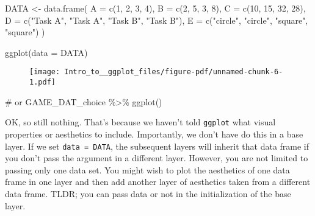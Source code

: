 \documentclass[
  letterpaper,
  DIV=11,
  numbers=noendperiod]{scrartcl}
\newenvironment{Shaded}{\begin{snugshade}}{\end{snugshade}}
\newcommand{\AttributeTok}[1]{\textcolor[rgb]{0.40,0.45,0.13}{#1}}
\newcommand{\CommentTok}[1]{\textcolor[rgb]{0.37,0.37,0.37}{#1}}
\newcommand{\DecValTok}[1]{\textcolor[rgb]{0.68,0.00,0.00}{#1}}
\newcommand{\FunctionTok}[1]{\textcolor[rgb]{0.28,0.35,0.67}{#1}}
\newcommand{\NormalTok}[1]{\textcolor[rgb]{0.00,0.23,0.31}{#1}}
\newcommand{\OtherTok}[1]{\textcolor[rgb]{0.00,0.23,0.31}{#1}}
\newcommand{\StringTok}[1]{\textcolor[rgb]{0.13,0.47,0.30}{#1}}
\begin{document}
\begin{Shaded}
\begin{Highlighting}[]
\NormalTok{DATA }\OtherTok{\textless{}{-}} \FunctionTok{data.frame}\NormalTok{(}
  \AttributeTok{A =} \FunctionTok{c}\NormalTok{(}\DecValTok{1}\NormalTok{, }\DecValTok{2}\NormalTok{, }\DecValTok{3}\NormalTok{, }\DecValTok{4}\NormalTok{), }
  \AttributeTok{B =} \FunctionTok{c}\NormalTok{(}\DecValTok{2}\NormalTok{, }\DecValTok{5}\NormalTok{, }\DecValTok{3}\NormalTok{, }\DecValTok{8}\NormalTok{), }
  \AttributeTok{C =} \FunctionTok{c}\NormalTok{(}\DecValTok{10}\NormalTok{, }\DecValTok{15}\NormalTok{, }\DecValTok{32}\NormalTok{, }\DecValTok{28}\NormalTok{), }
  \AttributeTok{D =} \FunctionTok{c}\NormalTok{(}\StringTok{"Task A"}\NormalTok{, }\StringTok{"Task A"}\NormalTok{, }\StringTok{"Task B"}\NormalTok{, }\StringTok{"Task B"}\NormalTok{),}
  \AttributeTok{E =} \FunctionTok{c}\NormalTok{(}\StringTok{"circle"}\NormalTok{, }\StringTok{"circle"}\NormalTok{, }\StringTok{"square"}\NormalTok{, }\StringTok{"square"}\NormalTok{)}
\NormalTok{  )}
\end{Highlighting}
\end{Shaded}

\begin{Shaded}
\begin{Highlighting}[]
\FunctionTok{ggplot}\NormalTok{(}\AttributeTok{data =}\NormalTok{ DATA)}
\end{Highlighting}
\end{Shaded}

\begin{figure}[H]

{\centering \texttt{[image: Intro\_to\_\_ggplot\_files/figure-pdf/unnamed-chunk-6-1.pdf]}

}

\end{figure}

\begin{Shaded}
\begin{Highlighting}[]
\CommentTok{\# or GAME\_DAT\_choice \%\textgreater{}\% ggplot()}
\end{Highlighting}
\end{Shaded}

OK, so still nothing. That's because we haven't told \texttt{ggplot}
what visual properties or aesthetics to include. Importantly, we don't
have do this in a base layer. If we set \texttt{data\ =\ DATA}, the
subsequent layers will inherit that data frame if you don't pass the
argument in a different layer. However, you are not limited to passing
only one data set. You might wish to plot the aesthetics of one data
frame in one layer and then add another layer of aesthetics taken from a
different data frame. TLDR; you can pass data or not in the
initialization of the base layer.
\end{document}
